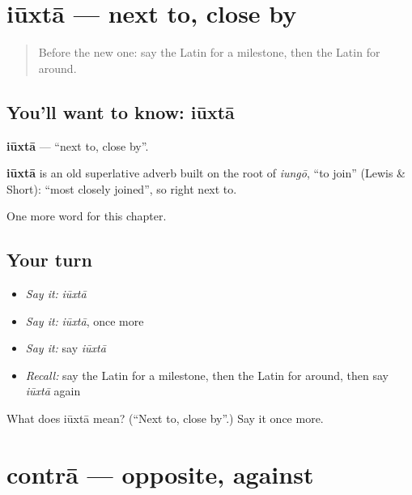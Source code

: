 \section[iūxtā]{iūxtā — next to, close by}

\label{lesson:LA-C119-iuxta}



\begin{quote}
Before the new one: say the Latin for a milestone, then the Latin for around.
\end{quote}

\subsection*{You'll want to know: iūxtā}
\textbf{iūxtā} — \textquotedblleft{}next to, close by\textquotedblright{}.

\begin{cousinweb}
\textbf{iūxtā} is an old superlative adverb built on the root of \emph{iungō}, \textquotedblleft{}to join\textquotedblright{} (Lewis \& Short): \textquotedblleft{}most closely joined\textquotedblright{}, so right next to.
\end{cousinweb}

\begin{grammarlens}[title={What you've built}]
One more word for this chapter.
\end{grammarlens}

\subsection*{Your turn}
\begin{itemize}
\raggedright
  \item \emph{Say it:} \emph{iūxtā}
  \item \emph{Say it:} \emph{iūxtā}, once more
  \item \emph{Say it:} say \emph{iūxtā}
  \item \emph{Recall:} say the Latin for a milestone, then the Latin for around, then say \emph{iūxtā} again
\end{itemize}

\begin{tcolorbox}[breakable,colback=teal!4,colframe=teal!35!black,title={Before you move on}]
What does iūxtā mean? (\textquotedblleft{}Next to, close by\textquotedblright{}.) Say it once more.
\end{tcolorbox}
\section[contrā]{contrā — opposite, against}

